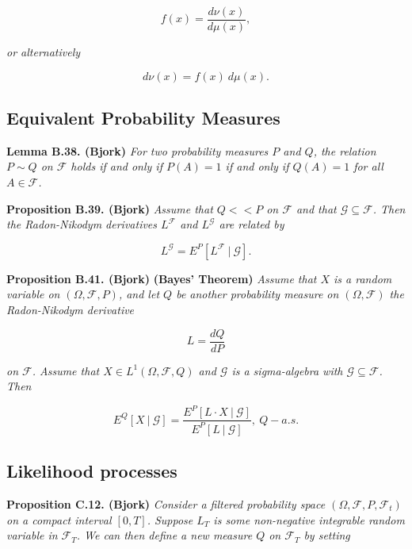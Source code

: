 \documentclass[
]{book}
\begin{document}
\[
f(x)=\frac{d\nu(x)}{d\mu(x)},\tag{A.12}
\]

\emph{or alternatively}

\[
d\nu(x)=f(x)\ d\mu(x).\tag{A.13}
\]

\hypertarget{equivalent-probability-measures-1}{%
\subsection{Equivalent Probability Measures}\label{equivalent-probability-measures-1}}

\textbf{Lemma B.38. (Bjork)} \emph{For two probability measures \(P\) and \(Q\), the relation \(P\sim Q\) on \(\mathcal{F}\) holds if and only if \(P(A)=1\) if and only if \(Q(A)=1\) for all \(A\in\mathcal{F}\).}

\textbf{Proposition B.39. (Bjork)} \emph{Assume that \(Q << P\) on \(\mathcal{F}\) and that \(\mathcal{G}\subseteq \mathcal{F}\). Then the Radon-Nikodym derivatives \(L^{\mathcal{F}}\) and \(L^{\mathcal{G}}\) are related by}

\[
L^{\mathcal{G}}=E^P[L^{\mathcal{F}}\ \vert\ \mathcal{G}].\tag{B.17}
\]

\textbf{Proposition B.41. (Bjork)} \textbf{(Bayes' Theorem)} \emph{Assume that \(X\) is a random variable on \((\Omega, \mathcal{F},P)\), and let \(Q\) be another probability measure on \((\Omega,\mathcal{F})\) the Radon-Nikodym derivative}

\[
L=\frac{d Q}{dP}
\]

\emph{on \(\mathcal{F}\). Assume that \(X\in L^1(\Omega,\mathcal{F},Q)\) and \(\mathcal{G}\) is a sigma-algebra with \(\mathcal{G}\subseteq \mathcal{F}\). Then}

\[
E^Q[X\ \vert\ \mathcal{G}]=\frac{E^P[L\cdot X\ \vert\ \mathcal{G}]}{E^P[L\ \vert\ \mathcal{G}]},\ Q-a.s.\tag{B.18}
\]

\hypertarget{likelihood-processes}{%
\subsection{Likelihood processes}\label{likelihood-processes}}

\textbf{Proposition C.12. (Bjork)} \emph{Consider a filtered probability space \((\Omega, \mathcal{F},P,\mathcal{F}_t)\) on a compact interval \([0,T]\). Suppose \(L_T\) is some non-negative integrable random variable in \(\mathcal{F}_T\). We can then define a new measure \(Q\) on \(\mathcal{F}_T\) by setting}
\end{document}
